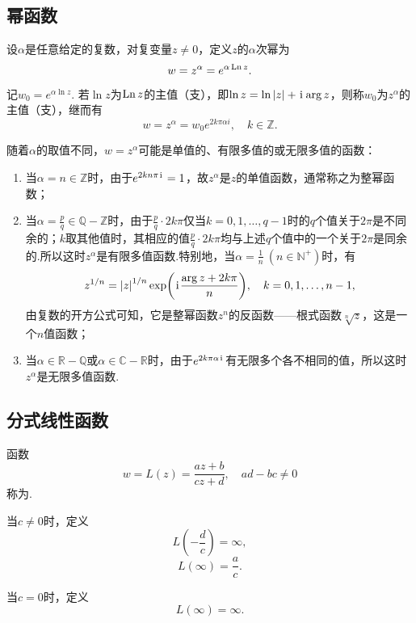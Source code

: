 \subsection{幂函数}
\begin{definition}
设\(\alpha\)是任意给定的复数，对复变量\(z \neq 0\)，定义\(z\)的\(\alpha\)次幂为\[
w = z^\alpha = e^{\alpha \operatorname{Ln} z}.
\]

记\(w_0 = e^{\alpha \ln z}\).
若\(\ln z\)为\(\operatorname{Ln} z\)的主值（支），即\(\ln z = \ln\abs{z} + \kern1pt\mathrm{i}\kern1pt \arg z\)，则称\(w_0\)为\(z^\alpha\)的主值（支），继而有\[
w = z^\alpha = w_0 e^{2k\pi\alpha i}, \quad k\in\mathbb{Z}.
\]
\end{definition}

\begin{property}
随着\(\alpha\)的取值不同，\(w=z^\alpha\)可能是单值的、有限多值的或无限多值的函数：
\begin{enumerate}
\item 当\(\alpha=n\in\mathbb{Z}\)时，由于\(e^{2 k n \pi \kern1pt\mathrm{i}\kern1pt}=1\)，故\(z^\alpha\)是\(z\)的单值函数，通常称之为整幂函数；
\item 当\(\alpha=\frac{p}{q}\in\mathbb{Q}-\mathbb{Z}\)时，由于\(\frac{p}{q} \cdot 2 k \pi\)仅当\(k=0,1,\dots,q-1\)时的\(q\)个值关于\(2\pi\)是不同余的；\(k\)取其他值时，其相应的值\(\frac{p}{q} \cdot 2 k \pi\)均与上述\(q\)个值中的一个关于\(2\pi\)是同余的.所以这时\(z^\alpha\)是有限多值函数.特别地，当\(\alpha=\frac{1}{n}\ (n\in\mathbb{N}^+)\)时，有\[
z^{1/n} = \abs{z}^{1/n} \exp(\kern1pt\mathrm{i}\kern1pt\frac{\arg z + 2 k \pi}{n}), \quad k=0,1,\dotsc,n-1,
\]由复数的开方公式可知，它是整幂函数\(z^n\)的反函数——根式函数\(\sqrt[n]{z}\)，这是一个\(n\)值函数；
\item 当\(\alpha\in\mathbb{R}-\mathbb{Q}\)或\(\alpha\in\mathbb{C}-\mathbb{R}\)时，由于\(e^{2 k \pi \alpha \kern1pt\mathrm{i}\kern1pt}\)有无限多个各不相同的值，所以这时\(z^\alpha\)是无限多值函数.
\end{enumerate}
\end{property}

\subsection{分式线性函数}
\begin{definition}
函数\[
w = L(z) = \frac{a z + b}{c z + d}, \quad ad-bc \neq 0
\]称为.

当\(c \neq 0\)时，定义\[
L\left(-\frac{d}{c}\right) = \infty,
\]\[
L(\infty) = \frac{a}{c}.
\]

当\(c = 0\)时，定义\[
L(\infty) = \infty.
\]
\end{definition}
